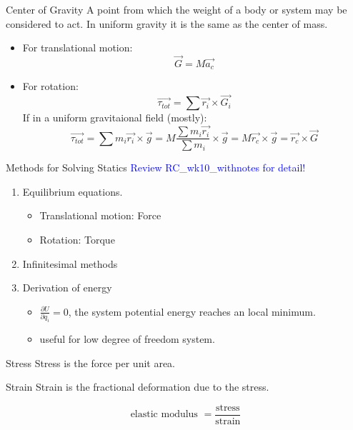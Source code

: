 \documentclass{beamer}
\begin{document}
\begin{frame}
  \begin{block}{Center of Gravity}
    A point from which the weight of a body or system may be considered to act. In uniform gravity it is the same as the center of mass.
  \end{block}
  \begin{itemize}
    \item For translational motion: $$\vec{G} = M\vec{a_c}$$
    \item For rotation: $$\vec{\tau_{tot}} = \sum \vec{r_i}\times \vec{G_i}$$
    If in a uniform gravitaional field (mostly):
    $$\vec{\tau_{tot}}= \sum m_i\vec{r_i}\times \vec{g} = M\frac{\sum m_i\vec{r_i}}{\sum m_i}\times \vec{g} = M\vec{r_c}\times \vec{g} = \vec{r_c}\times \vec{G}$$
  \end{itemize}
\end{frame}

\begin{frame}{Methods for Solving Statics}
  \textcolor{blue}{Review RC\_wk10\_withnotes for detail!}
  \begin{enumerate}
    \item Equilibrium equations.
    \begin{itemize}
      \item Translational motion: Force
      \item Rotation: Torque
    \end{itemize}
    \item Infinitesimal methods
    \item Derivation of energy
    \begin{itemize}
      \item $\frac{\partial U}{\partial q_i} = 0$, the system potential energy reaches an local minimum.
      \item useful for low degree of freedom system.
    \end{itemize}
  \end{enumerate}
\end{frame}

\begin{frame}
  \begin{block}{Stress}
    Stress is the force per unit area.
  \end{block}
  \begin{block}{Strain}
    Strain is the fractional deformation due to the stress.
  \end{block}
  $$\text{elastic modulus } = \frac{\text{stress}}{\text{strain}}$$
\end{frame}
\end{document}
